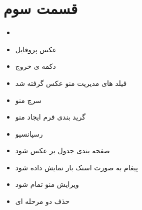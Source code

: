 \documentclass[12pt]{article}
\begin{document}
\section{قسمت سوم}


\begin{itemize}
	\item {}
	\qquad \checkmark 
	\item عکس پروفایل
	\qquad \checkmark 
	\item دکمه ی خروج
	\qquad \checkmark 
	\item فیلد های مدیریت منو عکس گرفته شد
	\qquad \checkmark 
	\item سرچ منو
	\item گرید بندی فرم ایجاد منو
	\qquad \checkmark 
	\item رسپانسیو
	\qquad \checkmark 
	\item صفحه بندی جدول بر عکس شود
	\qquad \checkmark 
	\item پیغام به صورت اسنک بار نمایش داده شود
	\qquad \checkmark 
	\item ویرایش منو تمام شود
	\item حذف دو مرحله ای
	\qquad \checkmark 
\end{itemize}
\end{document}
